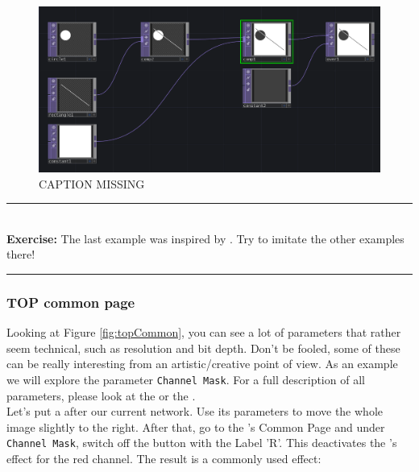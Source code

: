\begin{figure}[H]
	\centering
	\includegraphics[width=\textwidth]{img/graphical.PNG}
	\caption[shortCaption]
	{CAPTION MISSING}
	\label{fig:graphical}
\end{figure}


\noindent\rule{12cm}{0.4pt}
\\
	\textbf{Exercise:}
	The last example was inspired by . Try to imitate the other examples there!
\\
\noindent\rule{12cm}{0.4pt}



\subsubsection{TOP common page}

Looking at Figure \ref{fig:topCommon}, you can see a lot of parameters that rather seem technical, such as resolution and bit depth. Don't be fooled, some of these can be really interesting from an artistic/creative point of view. As an example we will explore the parameter \texttt{Channel Mask}. For a full description of all parameters, please look at the  or the .\\
Let's put a  after our current network. Use its parameters to move the whole image slightly to the right. After that, go to the 's Common Page and under \texttt{Channel Mask}, switch off the button with the Label 'R'. This deactivates the \TOP's effect for the red channel. The result is a commonly used effect:

